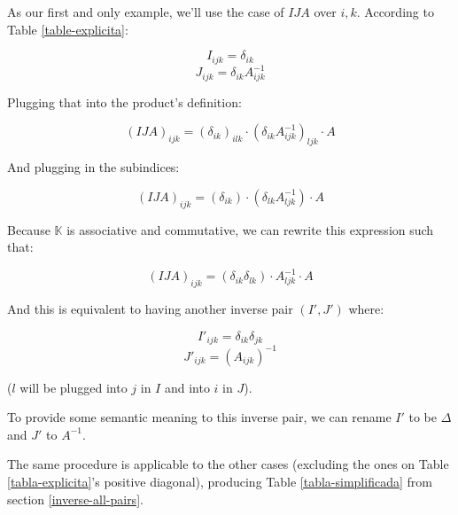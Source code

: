 As our first and only example, we'll use the case of $IJA$ over $i, k$. According to Table \ref{table-explicita}:

$$I_{ijk} = \delta_{ik}$$
$$J_{ijk} = \delta_{ik} A_{ijk}^{-1}$$

Plugging that into the product's definition:

$$(IJA)_{ijk} = (\delta_{ik})_{ilk} \cdot (\delta_{ik} A_{ijk}^{-1})_{ljk} \cdot A$$

And plugging in the subindices:

$$(IJA)_{ijk} = (\delta_{ik}) \cdot (\delta_{lk} A_{ljk}^{-1}) \cdot A$$

Because $\mathbb{K}$ is associative and commutative, we can rewrite this expression such that:

$$(IJA)_{ijk} = (\delta_{ik} \delta_{lk}) \cdot A_{ljk}^{-1} \cdot A$$

And this is equivalent to having another inverse pair $(I', J')$ where:

$$I'_{ijk} = \delta_{ik} \delta_{jk}$$
$$J'_{ijk} = (A_{ijk})^{-1}$$

($l$ will be plugged into $j$ in $I$ and into $i$ in $J$).

To provide some semantic meaning to this inverse pair, we can rename $I'$ to be $\Delta$ and $J'$ to $A^{-1}$.

The same procedure is applicable to the other cases (excluding the ones on Table \ref{tabla-explicita}'s positive diagonal), producing Table \ref{tabla-simplificada} from section \ref{inverse-all-pairs}.
